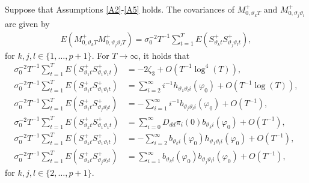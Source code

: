 {{\begin{lemma} \label{genlemmma1_1}
Suppose that Assumptions \ref{A2}-\ref{A5} holds. The covariances of  $M^+_{0,\vartheta_k  T}$ and  $M^+_{0,\vartheta_j \vartheta_l}$ are given by 
\begin{align*}
      E\left(  M^+_{0,\vartheta_k  T}  M^+_{0,\vartheta_j \vartheta_l   T} \right) = \sigma_0^{-2} T^{-1}  \sum_{t = 1}^T E \left( S^+_{\vartheta_k t}   S^+_{\vartheta_j \vartheta_l  t} \right), 
\end{align*}
for $k,j,l \in \{1,\ldots,p+1 \}$. 
For $T\rightarrow \infty$, it holds that 
\begin{align}
     \sigma_0^{-2} T^{-1}\sum_{t = 1}^T  E \left( S_{\vartheta_1 t}^+ S_{\vartheta_1 \vartheta_1 t}^+  \right) &= -2 \zeta_3 + O(T^{-1} \log^4(T) ), \label{l1_1a} \\
     \sigma_0^{-2} T^{-1} \sum_{t = 1}^T  E \left( S_{\vartheta_1 t}^+ S_{\vartheta_1 \vartheta_l t}^+  \right) &=    \sum_{i = 2}^{\infty} i^{-1} h_{\vartheta_1 \vartheta_l i}(\varphi_0) + O(T^{-1} \log(T)), \label{l1_1b}\\
     \sigma_0^{-2} T^{-1} \sum_{t = 1}^T  E \left( S_{\vartheta_1 t}^+ S_{\vartheta_j \vartheta_l t}^+  \right) &=  -    \sum_{i = 1}^{\infty}  i^{-1} b_{\vartheta_j \vartheta_l i}(\varphi_0) + O( T^{-1}), \label{l1_1c}\\
    \sigma_0^{-2} T^{-1}\sum_{t = 1}^T  E \left( S_{\vartheta_k t}^+ S_{\vartheta_1 \vartheta_1 t}^+  \right) &=  \sum_{i = 0}^{\infty} D_{dd} \pi_{i}(0)  b_{\vartheta_k i}(\varphi_0)  + O(T^{-1}), \label{l1_1d}\\
     \sigma_0^{-2} T^{-1} \sum_{t = 1}^T  E \left( S_{\vartheta_k t}^+ S_{\vartheta_1 \vartheta_l t}^+  \right) &= -    \sum_{i = 2}^{\infty}   b_{\vartheta_k i}(\varphi_0) h_{\vartheta_1 \vartheta_l i}(\varphi_0) + O( T^{-1}), \label{l1_1e} \\
     \sigma_0^{-2} T^{-1} \sum_{t = 1}^T  E \left( S_{\vartheta_k t}^+ S_{\vartheta_j \vartheta_l t}^+  \right) &=     \sum_{i = 1}^{\infty} b_{\vartheta_k i}(\varphi_0) b_{\vartheta_j \vartheta_l i}(\varphi_0) + O( T^{-1}), \label{l1_1f}
\end{align}
for $k,j,l \in \{2,\ldots,p+1 \}$.


\end{lemma}}}
